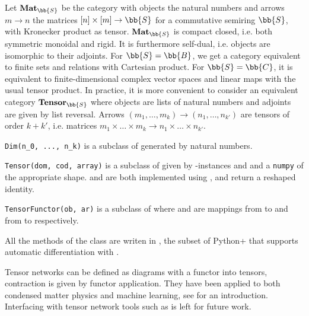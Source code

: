 
Let $\mathbf{Mat}_\bb{S}$ be the category with objects the natural numbers and arrows $m \to n$ the matrices $[n] \times [m] \to \bb{S}$ for a commutative semiring $\bb{S}$, with Kronecker product as tensor.
$\mathbf{Mat}_\bb{S}$ is compact closed, i.e. both symmetric monoidal and rigid. It is furthermore self-dual, i.e. objects are isomorphic to their adjoints.
For $\bb{S} = \bb{B}$, we get a category equivalent to finite sets and relations with Cartesian product.
For $\bb{S} = \bb{C}$, it is equivalent to finite-dimensional complex vector spaces and linear maps with the usual tensor product.
In practice, it is more convenient to consider an equivalent category $\mathbf{Tensor}_\bb{S}$ where objects are lists of natural numbers and adjoints are given by list reversal.
Arrows $(m_1, \dots, m_k) \to (n_1, \dots, n_{k'})$ are tensors of order $k + k'$, i.e. matrices $m_1 \times \dots \times m_k \to n_1 \times \dots \times n_{k'}$.

\begin{class}\normalfont\texttt{Dim(n\_0, ..., n\_k)}
is a subclass of  generated by natural numbers.
\end{class}

\begin{class}\normalfont\texttt{Tensor(dom, cod, array)}
is a subclass of  given by -instances  and  and a \texttt{numpy} \cite{VanderWaltEtAl11}  of the appropriate shape.
 and  are both implemented using ,  and  return a reshaped identity.
\end{class}

\begin{class}\normalfont\texttt{TensorFunctor(ob, ar)}
is a subclass of  where  and  are mappings from  to  and from  to  respectively.
\end{class}

\begin{remark}
All the methods of the  class are writen in , the subset of Python+ that supports automatic differentiation with  \cite{Google/jax20}.
\end{remark}

\begin{example}
Tensor networks can be defined as diagrams with a functor into tensors, contraction is given by functor application. They have been applied to both condensed matter physics and machine learning, see \cite{Orus14} for an introduction.
Interfacing  with tensor network tools such as \cite{KossaifiEtAl18,HauschildPollmann18,RobertsEtAl19} is left for future work.
\end{example}

